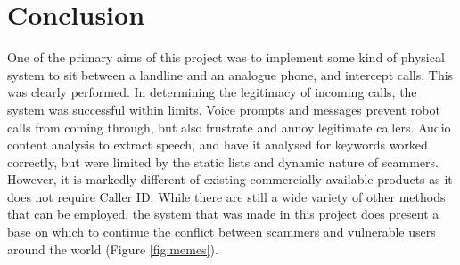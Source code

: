 \documentclass[main.tex]{subfiles}
\begin{document}
\section{Conclusion}

One of the primary aims of this project was to implement some kind of physical system to sit between a landline and an analogue phone, and intercept calls. This was clearly performed. In determining the legitimacy of incoming calls, the system was successful within limits. Voice prompts and messages prevent robot calls from coming through, but also frustrate and annoy legitimate callers. Audio content analysis to extract speech, and have it analysed for keywords worked correctly, but were limited by the static lists and dynamic nature of scammers. However, it is markedly different of existing commercially available products as it does not require Caller ID. While there are still a wide variety of other methods that can be employed, the system that was made in this project does present a base on which to continue the conflict between scammers and vulnerable users around the world (Figure \ref{fig:memes}).
\end{document}
